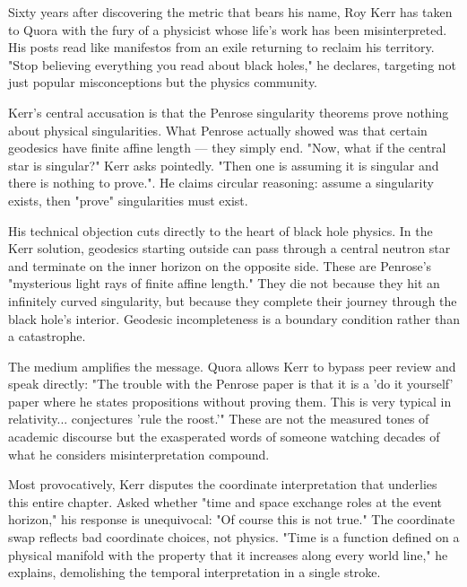 \begin{commentary}
Sixty years after discovering the metric that bears his name, Roy Kerr has taken to Quora with the fury of a physicist whose life's work has been misinterpreted. His posts read like manifestos from an exile returning to reclaim his territory. "Stop believing everything you read about black holes," he declares, targeting not just popular misconceptions but the physics community.

Kerr's central accusation is that the Penrose singularity theorems prove nothing about physical singularities. What Penrose actually showed was that certain geodesics have finite affine length — they simply end. "Now, what if the central star is singular?" Kerr asks pointedly. "Then one is assuming it is singular and there is nothing to prove.". He claims circular reasoning: assume a singularity exists, then "prove" singularities must exist.

His technical objection cuts directly to the heart of black hole physics. In the Kerr solution, geodesics starting outside can pass through a central neutron star and terminate on the inner horizon on the opposite side. These are Penrose's "mysterious light rays of finite affine length." They die not because they hit an infinitely curved singularity, but because they complete their journey through the black hole's interior. Geodesic incompleteness is a boundary condition rather than a catastrophe.

The medium amplifies the message. Quora allows Kerr to bypass peer review and speak directly: "The trouble with the Penrose paper is that it is a 'do it yourself' paper where he states propositions without proving them. This is very typical in relativity... conjectures 'rule the roost.'" These are not the measured tones of academic discourse but the exasperated words of someone watching decades of what he considers misinterpretation compound.

Most provocatively, Kerr disputes the coordinate interpretation that underlies this entire chapter. Asked whether "time and space exchange roles at the event horizon," his response is unequivocal: "Of course this is not true." The coordinate swap reflects bad coordinate choices, not physics. "Time is a function defined on a physical manifold with the property that it increases along every world line," he explains, demolishing the temporal interpretation in a single stroke.


\end{commentary}

